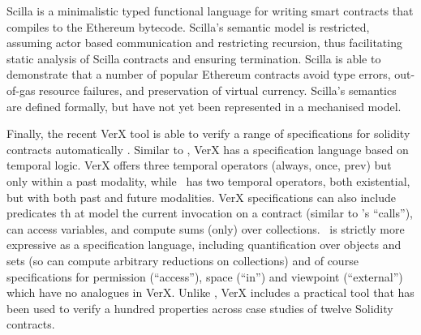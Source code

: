 Scilla \cite{scillaOOPSLA19} is a minimalistic typed functional
language for writing smart contracts that compiles to the Ethereum
bytecode. Scilla's semantic model is restricted, assuming actor based
communication and restricting recursion,  thus facilitating static
analysis of Scilla contracts and ensuring termination.
Scilla is able to demonstrate that a number of popular Ethereum
contracts avoid type errors, out-of-gas resource failures, and
preservation of virtual currency. 
Scilla's semantics are defined formally, but have not yet been represented in a
mechanised model.



Finally, the recent VerX tool is able to verify a range of
specifications for solidity contracts automatically \cite{VerX}.
Similar to \Chainmail, VerX has a specification language based on
temporal logic.  VerX offers three temporal operators (always, once,
prev) but only within a past modality, while \Chainmail\ has two
temporal operators, both existential, but with both past and future
modalities.   VerX specifications can also include predicates th	at
model the current invocation on a contract (similar to \Chainmail's
``calls''), can access variables, and compute sums (only) over
collections. \Chainmail\ is strictly more expressive as a
specification language, including quantification over objects and sets
(so can compute arbitrary reductions on collections) and of course
specifications for permission (``access''), space (``in'') and
viewpoint (``external'') which have no analogues in VerX. 
Unlike \Chainmail, VerX includes a practical tool that has
been used to verify   a hundred properties across case studies of
twelve Solidity contracts.

